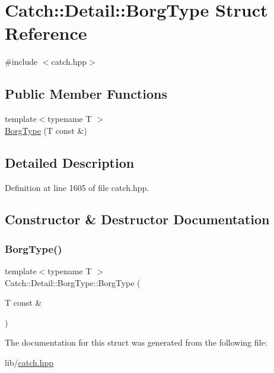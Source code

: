 \hypertarget{struct_catch_1_1_detail_1_1_borg_type}{}\section{Catch\+:\+:Detail\+:\+:Borg\+Type Struct Reference}
\label{struct_catch_1_1_detail_1_1_borg_type}


{\ttfamily \#include $<$catch.\+hpp$>$}

\subsection*{Public Member Functions}
\begin{DoxyCompactItemize}
\item 
{\footnotesize template$<$typename T $>$ }\\\hyperlink{struct_catch_1_1_detail_1_1_borg_type_a780a9946ed0d654f0bfc043c8fc505d8}{Borg\+Type} (T const \&)
\end{DoxyCompactItemize}


\subsection{Detailed Description}


Definition at line 1605 of file catch.\+hpp.



\subsection{Constructor \& Destructor Documentation}
\hypertarget{struct_catch_1_1_detail_1_1_borg_type_a780a9946ed0d654f0bfc043c8fc505d8}{}\label{struct_catch_1_1_detail_1_1_borg_type_a780a9946ed0d654f0bfc043c8fc505d8} 
\subsubsection{\texorpdfstring{Borg\+Type()}{BorgType()}}
{\footnotesize\ttfamily template$<$typename T $>$ \\
Catch\+::\+Detail\+::\+Borg\+Type\+::\+Borg\+Type (\begin{DoxyParamCaption}\item[{T const \&}]{ }\end{DoxyParamCaption})}



The documentation for this struct was generated from the following file\+:\begin{DoxyCompactItemize}
\item 
lib/\hyperlink{catch_8hpp}{catch.\+hpp}\end{DoxyCompactItemize}
